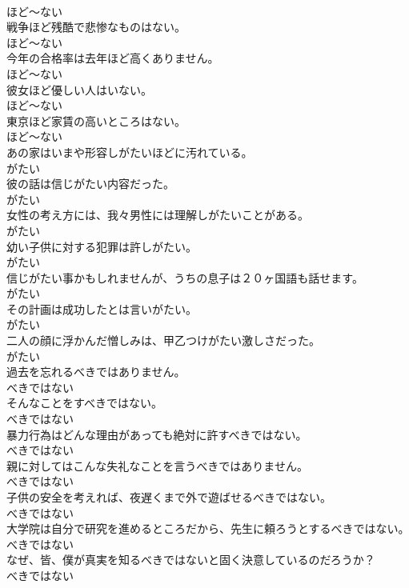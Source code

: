 \documentclass[8pt]{extreport}
\begin{document}
\begin{CJK}{UTF8}{min}
\\	ほど～ない	
\\	戦争ほど残酷で悲惨なものはない。	
\\	ほど～ない	
\\	今年の合格率は去年ほど高くありません。	
\\	ほど～ない	
\\	彼女ほど優しい人はいない。	
\\	ほど～ない	
\\	東京ほど家賃の高いところはない。	
\\	ほど～ない	
\\	あの家はいまや形容しがたいほどに汚れている。	
\\	がたい	
\\	彼の話は信じがたい内容だった。	
\\	がたい	
\\	女性の考え方には、我々男性には理解しがたいことがある。	
\\	がたい	
\\	幼い子供に対する犯罪は許しがたい。	
\\	がたい	
\\	信じがたい事かもしれませんが、うちの息子は２０ヶ国語も話せます。	
\\	がたい	
\\	その計画は成功したとは言いがたい。	
\\	がたい	
\\	二人の顔に浮かんだ憎しみは、甲乙つけがたい激しさだった。	
\\	がたい	
\\	過去を忘れるべきではありません。	
\\	べきではない	
\\	そんなことをすべきではない。	
\\	べきではない	
\\	暴力行為はどんな理由があっても絶対に許すべきではない。	
\\	べきではない	
\\	親に対してはこんな失礼なことを言うべきではありません。	
\\	べきではない	
\\	子供の安全を考えれば、夜遅くまで外で遊ばせるべきではない。	
\\	べきではない	
\\	大学院は自分で研究を進めるところだから、先生に頼ろうとするべきではない。	
\\	べきではない	
\\	なぜ、皆、僕が真実を知るべきではないと固く決意しているのだろうか？	
\\	べきではない	

\end{CJK}
\end{document}
